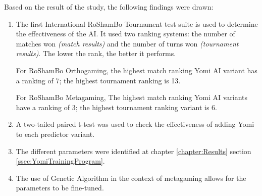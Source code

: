 Based on the result of the study, the following findings were drawn:

\begin{enumerate}[label=\arabic*.]
\item The first International RoShamBo Tournament test suite is used to determine the effectiveness of the AI. It used two ranking systems: the number of matches won \textit{(match results)} and the number of turns won \textit{(tournament results)}. The lower the rank, the better it performs.

For RoShamBo Orthogaming, the highest match ranking Yomi AI variant has a ranking of 7; the highest tournament ranking is 13.

For RoShamBo Metagaming, The highest match ranking Yomi AI variants have a ranking of 3; the highest tournament ranking variant is 6.

\item A two-tailed paired t-test was used to check the effectiveness of adding Yomi to each predictor variant. 

\item The different parameters were identified at chapter \ref{chapter:Results} section \ref{ssec:YomiTrainingProgram}.

\item The use of Genetic Algorithm in the context of metagaming allows for the parameters to be fine-tuned.

\end{enumerate}